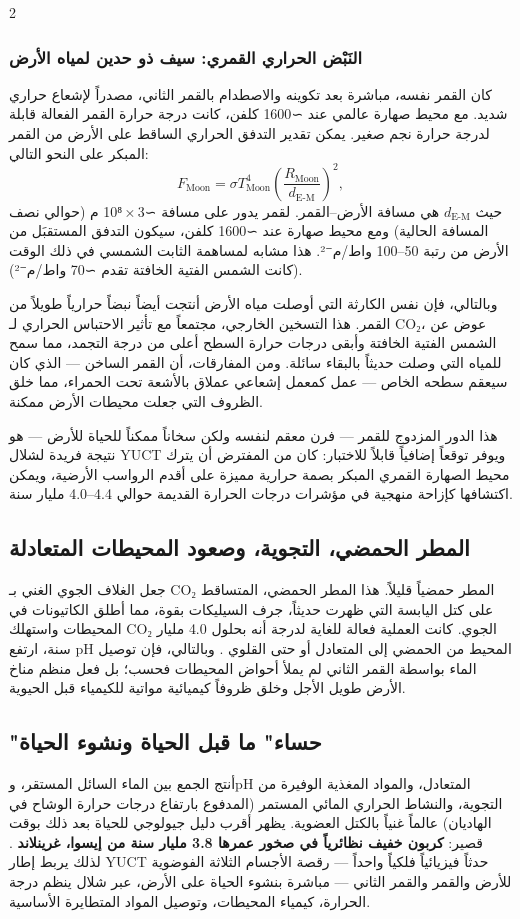 \documentclass[11pt,a4paper]{article}
\begin{document}
\begin{multicols}{2}
		\subsubsection{النَبْض الحراري القمري: سيف ذو حدين لمياه الأرض}
		كان القمر نفسه، مباشرة بعد تكوينه والاصطدام بالقمر الثاني، مصدراً لإشعاع حراري شديد. مع محيط صهارة عالمي عند ∼1600 كلفن، كانت درجة حرارة القمر الفعالة قابلة لدرجة حرارة نجم صغير. يمكن تقدير التدفق الحراري الساقط على الأرض من القمر المبكر على النحو التالي:
		\[
		F_{\text{Moon}} = \sigma T_{\text{Moon}}^{4} \left( \frac{R_{\text{Moon}}}{d_{\text{E-M}}} \right)^{2},
		\]
		حيث \(d_{\text{E-M}}\) هي مسافة الأرض–القمر. لقمر يدور على مسافة ∼3 × 10⁸ م (حوالي نصف المسافة الحالية) ومع محيط صهارة عند ∼1600 كلفن، سيكون التدفق المستقبَل من الأرض من رتبة 50–100 واط/م⁻². هذا مشابه لمساهمة الثابت الشمسي في ذلك الوقت (كانت الشمس الفتية الخافتة تقدم ∼70 واط/م⁻²).
		
		وبالتالي، فإن نفس الكارثة التي أوصلت مياه الأرض أنتجت أيضاً نبضاً حرارياً طويلاً من القمر. هذا التسخين الخارجي، مجتمعاً مع تأثير الاحتباس الحراري لـ CO₂، عوض عن الشمس الفتية الخافتة وأبقى درجات حرارة السطح أعلى من درجة التجمد، مما سمح للمياه التي وصلت حديثاً بالبقاء سائلة. ومن المفارقات، أن القمر الساخن — الذي كان سيعقم سطحه الخاص — عمل كمعمل إشعاعي عملاق بالأشعة تحت الحمراء، مما خلق الظروف التي جعلت محيطات الأرض ممكنة.
		
		هذا الدور المزدوج للقمر — فرن معقم لنفسه ولكن سخاناً ممكناً للحياة للأرض — هو نتيجة فريدة لشلال YUCT ويوفر توقعاً إضافياً قابلاً للاختبار: كان من المفترض أن يترك محيط الصهارة القمري المبكر بصمة حرارية مميزة على أقدم الرواسب الأرضية، ويمكن اكتشافها كإزاحة منهجية في مؤشرات درجات الحرارة القديمة حوالي 4.4–4.0 مليار سنة.
		
		\subsection{المطر الحمضي، التجوية، وصعود المحيطات المتعادلة}
		جعل الغلاف الجوي الغني بـ CO₂ المطر حمضياً قليلاً. هذا المطر الحمضي، المتساقط على كتل اليابسة التي ظهرت حديثاً، جرف السيليكات بقوة، مما أطلق الكاتيونات في المحيطات واستهلك CO₂ الجوي. كانت العملية فعالة للغاية لدرجة أنه بحلول 4.0 مليار سنة، ارتفع pH المحيط من الحمضي إلى المتعادل أو حتى القلوي \cite{KrissansenTotton2019}. وبالتالي، فإن توصيل الماء بواسطة القمر الثاني لم يملأ أحواض المحيطات فحسب؛ بل فعل منظم مناخ الأرض طويل الأجل وخلق ظروفاً كيميائية مواتية للكيمياء قبل الحيوية.
		
		\subsection{"حساء" ما قبل الحياة ونشوء الحياة}
		أنتج الجمع بين الماء السائل المستقر، وpH المتعادل، والمواد المغذية الوفيرة من التجوية، والنشاط الحراري المائي المستمر (المدفوع بارتفاع درجات حرارة الوشاح في الهاديان) عالماً غنياً بالكتل العضوية. يظهر أقرب دليل جيولوجي للحياة بعد ذلك بوقت قصير: \textbf{كربون خفيف نظائرياً في صخور عمرها 3.8 مليار سنة من إيسوا، غرينلاند} \cite{Arndt2012}. لذلك يربط إطار YUCT حدثاً فيزيائياً فلكياً واحداً — رقصة الأجسام الثلاثة الفوضوية للأرض والقمر والقمر الثاني — مباشرة بنشوء الحياة على الأرض، عبر شلال ينظم درجة الحرارة، كيمياء المحيطات، وتوصيل المواد المتطايرة الأساسية.
		

\end{multicols}
\end{document}
